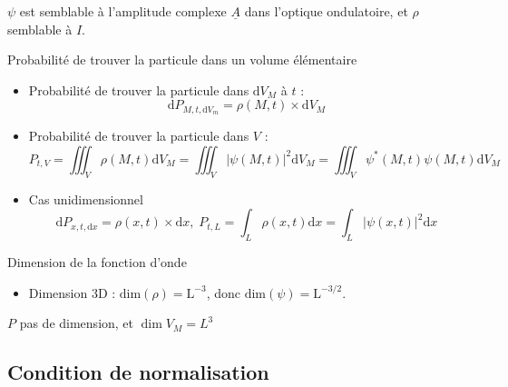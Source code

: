 \begin{note}{}{}
  $\psi$ est semblable à l'amplitude complexe $\underline{A}$ dans l'optique ondulatoire, et $\rho$ semblable à $I$.
\end{note}
\begin{Prop}{Probabilité de trouver la particule dans un volume élémentaire}{}
\begin{itemize}

    \item Probabilité de trouver la particule dans $\mathrm{d} V_M$ à $t$ :
        \[
          \boxed{\mathrm{d} P_{M,t, \mathrm{d} V_m}  = \rho(M,t) \times \mathrm{d} V_M}
        \]

    \item Probabilité de trouver la particule dans $V$ :
        \[
          \boxed{P_{t,V} = \iiint_V \rho(M,t) \mathrm{d} V_M  = \iiint_V |\psi(M,t)|^2 \mathrm{d}V_M = \iiint_V \psi ^* (M,t) \psi(M,t) \mathrm{d} V_M}
        \]
    \item Cas unidimensionnel
      \[
        \mathrm{d}P_{x,t, \mathrm{d}x} = \rho(x, t) \times \mathrm{d}x, \; P _{t,L} = \int _ L \rho(x,t) \mathrm{d}x = \int_L |\psi(x,t)|^2 \mathrm{d}x
      \]

\end{itemize}
\end{Prop}

\begin{Prop}{Dimension de la fonction d'onde}{}
\begin{itemize}

    \item Dimension 3D : $\mathrm{dim} (\rho) = \mathrm{L} ^{-3}$, donc $\mathrm{dim} (\psi) = \mathrm{L} ^{-3 / 2}$. 

\end{itemize}
\end{Prop}
\begin{myproof}{}{}
$P$ pas de dimension, et $\dim V_M = L ^{3}$
\end{myproof}


\subsection{Condition de normalisation} %
\label{sub:Condition de normalisation}

